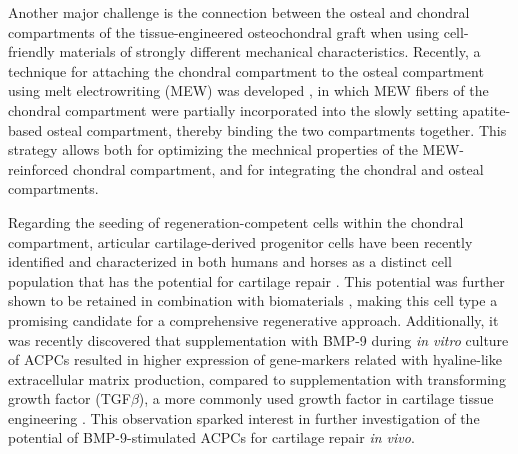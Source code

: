 \documentclass[twocolumn, empirical, authordate, issue]{jote-new-article}
\begin{document}
Another major challenge is the connection between the osteal and chondral compartments of the tissue-engineered osteochondral graft when using cell-friendly materials of strongly different mechanical characteristics. Recently, a technique for attaching the chondral compartment to the osteal compartment using melt electrowriting (MEW) was developed \parencite{Diloksumpan2020}, in which MEW fibers of the chondral compartment were partially incorporated into the slowly setting apatite-based osteal compartment, thereby binding the two compartments together. This strategy allows both for optimizing the mechnical properties of the MEW-reinforced chondral compartment, and for integrating the chondral and osteal compartments.

Regarding the seeding of regeneration-competent cells within the chondral compartment, articular cartilage-derived progenitor cells have been recently identified and characterized in both humans and horses as a distinct cell population that has the potential for cartilage repair \parencite{McCarthy2012, Williams2010}. This potential was further shown to be retained in combination with biomaterials \parencite{Frisbie2015, Levato2017}, making this cell type a promising candidate for a comprehensive regenerative approach. Additionally, it was recently discovered that supplementation with BMP-9 during \emph{in vitro} culture of ACPCs resulted in higher expression of gene-markers related with hyaline-like extracellular matrix production, compared to supplementation with transforming growth factor (TGF$\beta$), a more commonly used growth factor in cartilage tissue engineering \parencite{Morgan2020}. This observation sparked interest in further investigation of the potential of BMP-9-stimulated ACPCs for cartilage repair \emph{in vivo}.
\end{document}
